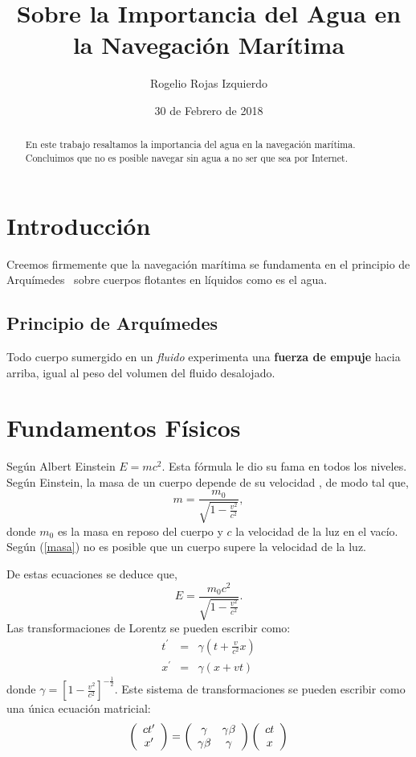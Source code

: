 \documentclass[letter,12pt]{article}
\title{Sobre la Importancia del Agua en la Navegación Marítima}
\author{Rogelio Rojas Izquierdo}
\date{30 de Febrero de 2018}
\begin{document}
\maketitle
\begin{abstract}
En este trabajo resaltamos la importancia
 del agua en la navegación marítima. Concluimos
  que no es posible navegar sin agua a no ser que 
sea
 por Internet.
\end{abstract}
\section{Introducción}
Creemos firmemente que la navegación marítima 
se fundamenta en el principio de Arquímedes~\cite{arquimedes}
 sobre cuerpos flotantes en líquidos como es el agua.
\subsection{Principio de Arquímedes}
Todo cuerpo sumergido en un \textit{fluido} 
experimenta una \textbf{fuerza de empuje} hacia
 arriba, igual al peso del volumen del fluido
  desalojado.

\section{Fundamentos Físicos}

Según Albert Einstein $E=m c^{2}$. Esta
 fórmula le dio su fama en todos los niveles. Según
  Einstein, la masa de un cuerpo depende de su velocidad
  , de modo tal que,
\begin{equation}
m=\frac{m_{0}}{\sqrt{1-\frac{v^{2}}{c^{2}}}},
\label{masa}
\end{equation}
donde $m_0$ es la masa
 en reposo del cuerpo y $c$ la velocidad
  de la luz en el vacío. Según (\ref{masa}) no es posible
   que un cuerpo supere la velocidad de la luz.

De estas
 ecuaciones se deduce que,
$$E=\frac{m_0 c^2}{\sqrt{1-\frac{v^2}{c^2}}}.$$
Las transformaciones de Lorentz se pueden escribir como:
\begin{eqnarray}
t^{\prime}&=&\gamma\left( t +\frac{v}{c^2}x\right)\label{t-lorentz}\\
x^{\prime}&=&\gamma\left(x + v t\right)\label{x-lorentz}
\end{eqnarray}
donde $\gamma = \left[1-\frac{v^2}{c^2}\right]^{-\frac{1}{2}}$. Este sistema de transformaciones se pueden escribir como una única ecuación matricial:  
$$\left(
\begin{array}{c}
ct^{\prime}\\
x^{\prime}
\end{array}
\right)
=\left(
\begin{array}{c c}
\gamma & \gamma\beta  \\
\gamma\beta & \gamma
\end{array}
\right)
\left(
\begin{array}{c}
ct\\
x
\end{array}
\right)
$$
\end{document}
